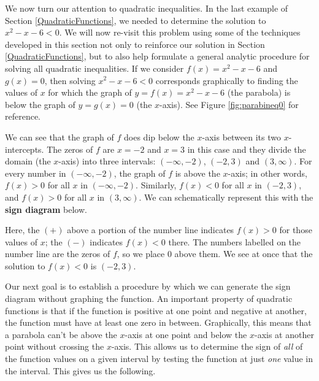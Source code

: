 \medskip


We now turn our attention to quadratic inequalities. In the last example of Section \ref{QuadraticFunctions}, we needed to determine the solution to $x^2 - x -6 < 0$.  We will now re-visit this problem using some of the techniques developed in this section not only to reinforce our solution in Section \ref{QuadraticFunctions}, but to also help formulate a general analytic procedure for solving all quadratic inequalities. If we consider $f(x) = x^2-x-6$ and $g(x)=0$, then solving $x^2 - x -6 < 0$ corresponds graphically to finding the values of $x$ for which the graph of $y=f(x)=x^2-x-6$ (the parabola) is below the graph of $y=g(x)=0$ (the $x$-axis). See Figure \ref{fig:parabineq0} for reference.


\label{firstsigndiagram}

We can see that the graph of $f$ does dip below the $x$-axis between its two $x$-intercepts.  The zeros of $f$ are $x=-2$ and $x=3$ in this case and they divide the domain (the $x$-axis) into three intervals:  $(-\infty, -2)$, $(-2,3)$ and $(3, \infty)$.  For every number in $(-\infty, -2)$, the graph of $f$ is above the $x$-axis; in other words, $f(x) > 0$ for all $x$ in $(-\infty, -2)$. Similarly, $f(x) < 0$ for all $x$ in $(-2,3)$, and $f(x) > 0$ for all $x$ in $(3, \infty)$.  We can schematically represent this with the {\bf sign diagram} below.

\begin{center}
\end{center}

Here, the $(+)$ above a portion of the number line indicates $f(x) > 0$ for those values of $x$; the $(-)$ indicates $f(x) < 0$ there.  The numbers labelled on the number line are the zeros of $f$, so we place $0$ above them.  We see at once that the solution to $f(x) < 0$ is $(-2,3)$.  

\smallskip

Our next goal is to establish a procedure by which we can generate the sign diagram without graphing the function.  An important property of quadratic functions is that if the function is positive at one point and negative at another, the function must have at least one zero in between.  Graphically, this means that a parabola can't be above the $x$-axis at one point and below the $x$-axis at another point without crossing the $x$-axis.  This allows us to determine the sign of \emph{all} of the function values on a given interval by testing the function at just \emph{one} value in the interval.  This gives us the following.

